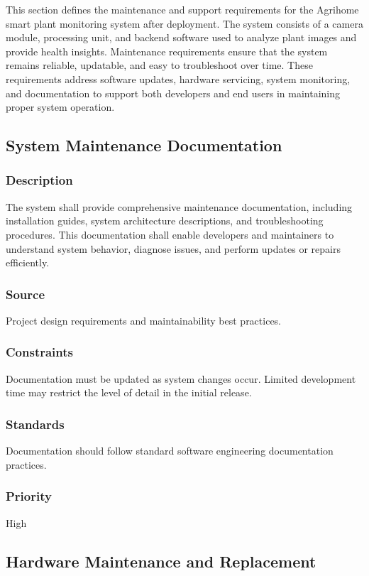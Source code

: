 

This section defines the maintenance and support requirements for the Agrihome smart plant monitoring system after deployment. The system consists of a camera module, processing unit, and backend software used to analyze plant images and provide health insights. Maintenance requirements ensure that the system remains reliable, updatable, and easy to troubleshoot over time. These requirements address software updates, hardware servicing, system monitoring, and documentation to support both developers and end users in maintaining proper system operation.

\subsection{System Maintenance Documentation}
\subsubsection{Description}
The system shall provide comprehensive maintenance documentation, including installation guides, system architecture descriptions, and troubleshooting procedures. This documentation shall enable developers and maintainers to understand system behavior, diagnose issues, and perform updates or repairs efficiently.

\subsubsection{Source}
Project design requirements and maintainability best practices.

\subsubsection{Constraints}
Documentation must be updated as system changes occur. Limited development time may restrict the level of detail in the initial release.

\subsubsection{Standards}
Documentation should follow standard software engineering documentation practices.

\subsubsection{Priority}
High


\subsection{Hardware Maintenance and Replacement}
